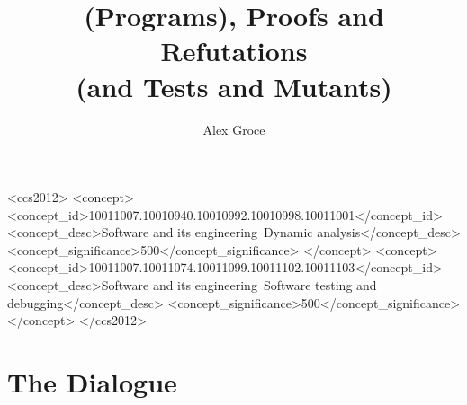 \documentclass[sigplan]{acmart}
\begin{document}
\title{(Programs), Proofs and Refutations\\(and Tests and Mutants)}

\author{Alex Groce}


\renewcommand{\shortauthors}{Alex Groce}

\begin{abstract}

\end{abstract}

\begin{CCSXML}
<ccs2012>
<concept>
<concept_id>10011007.10010940.10010992.10010998.10011001</concept_id>
<concept_desc>Software and its engineering~Dynamic analysis</concept_desc>
<concept_significance>500</concept_significance>
</concept>
<concept>
<concept_id>10011007.10011074.10011099.10011102.10011103</concept_id>
<concept_desc>Software and its engineering~Software testing and debugging</concept_desc>
<concept_significance>500</concept_significance>
</concept>
</ccs2012>
\end{CCSXML}




\maketitle

\section{The Dialogue}
\end{document}

